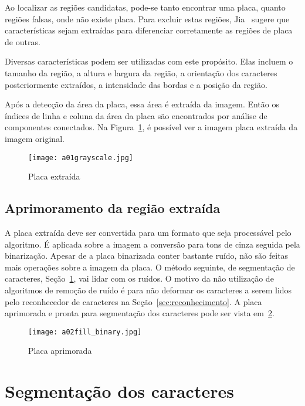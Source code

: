 Ao localizar as regiões candidatas, pode-se tanto encontrar uma placa, quanto
regiões falsas, onde não existe placa. Para excluir estas regiões,
Jia~\cite{jia2007region} sugere que características sejam extraídas para
diferenciar corretamente as regiões de placa de outras.

Diversas características podem ser utilizadas com este propósito. Elas incluem o
tamanho da região, a altura e largura da região, a orientação dos caracteres
posteriormente extraídos, a intensidade das bordas e a posição da região.

Após a detecção da área da placa, essa área é extraída da imagem. Então os
índices de linha e coluna da área da placa são encontrados por análise de
componentes conectados. Na Figura~\ref{fig:ext_true_number_plate}, é possível ver a
imagem placa extraída da imagem original.

\begin{figure}[H]
	\centering
	\texttt{[image: a01grayscale.jpg]}
	\caption{Placa extraída}
	\label{fig:ext_true_number_plate}
\end{figure}

\subsection{Aprimoramento da região extraída}

A placa extraída deve ser convertida para um formato que seja processável pelo
algoritmo. É aplicada sobre a imagem a conversão para tons de cinza seguida pela
binarização. Apesar de a placa binarizada conter bastante ruído, não são feitas
mais operações sobre a imagem da placa. O método seguinte, de segmentação de
caracteres, Seção~\ref{sec:segmentacao}, vai lidar com os ruídos. O motivo da
não utilização de algoritmos de remoção de ruído é para não deformar os
caracteres a serem lidos pelo reconhecedor de caracteres na
Seção~\ref{sec:reconhecimento}. A placa aprimorada e pronta para segmentação dos
caracteres pode ser vista em~\ref{fig:ext_enhanced_number_plate}.

\begin{figure}[H]
	\centering
	\texttt{[image: a02fill\_binary.jpg]}
	\caption{Placa aprimorada}
	\label{fig:ext_enhanced_number_plate}
\end{figure}

\section{Segmentação dos caracteres}
\label{sec:segmentacao}

